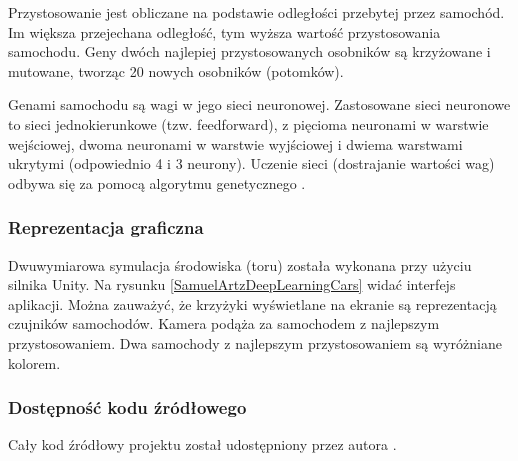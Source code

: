 Przystosowanie jest obliczane na podstawie odległości przebytej przez samochód. Im większa przejechana odległość, tym wyższa wartość przystosowania samochodu. Geny dwóch najlepiej przystosowanych osobników są krzyżowane i mutowane, tworząc 20 nowych osobników (potomków).

Genami samochodu są wagi w jego sieci neuronowej.
Zastosowane sieci neuronowe to sieci jednokierunkowe (tzw. feedforward),
z pięcioma neuronami w warstwie wejściowej, dwoma neuronami w warstwie wyjściowej i dwiema warstwami ukrytymi (odpowiednio 4 i 3 neurony).
Uczenie sieci (dostrajanie wartości wag) odbywa się za pomocą algorytmu genetycznego \cite{geneticAlgorithm:introduction}.

\subsubsection{Reprezentacja graficzna}
Dwuwymiarowa symulacja środowiska (toru) została wykonana przy użyciu silnika Unity. Na rysunku \ref{SamuelArtzDeepLearningCars} widać interfejs aplikacji. Można zauważyć, że krzyżyki wyświetlane na ekranie są reprezentacją czujników samochodów. Kamera podąża za samochodem z najlepszym przystosowaniem. Dwa samochody z najlepszym przystosowaniem są wyróżniane kolorem.

\subsubsection{Dostępność kodu źródłowego}
Cały kod źródłowy projektu został udostępniony przez autora \cite{artz:deepLearningCars:github}.

